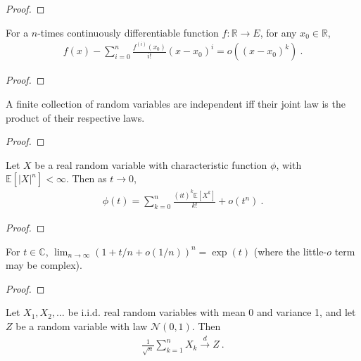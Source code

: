 \begin{proof}\leanok
{}
\end{proof}

\begin{lemma}\label{lem:taylor_peano}
\mathlibok
{}
For a $n$-times continuously differentiable function $f : \mathbb{R} \to E$, for any $x_0\in\mathbb{R}$,
\begin{align*}
f(x) - \sum_{i=0}^n\frac{f^{(i)}(x_0)}{i!}(x-x_0)^i = o((x - x_0)^k)
\: .
\end{align*}
\end{lemma}

\begin{proof}\leanok
\end{proof}

\begin{lemma}\label{lem:iIndepFun_iff_pi_map_eq_map}
\mathlibok
{}
A finite collection of random variables are independent iff their joint law is the product of their respective laws.
\end{lemma}

\begin{proof}\leanok
\end{proof}

\begin{lemma}\label{lem:charFun_taylor}
\leanok
{}
Let $X$ be a real random variable with characteristic function $\phi$, with $\mathbb{E}[\vert X \vert^n] < \infty$. Then as $t \to 0$,
\begin{align*}
\phi(t) = \sum_{k=0}^n \frac{(it)^k \mathbb{E}[X^k]}{k!} + o(t^n)
\: .
\end{align*}
\end{lemma}

\begin{proof}\leanok
{}
\end{proof}

\begin{lemma}\label{lem:tendsto_pow_exp_of_isLittleO}
\leanok
{}
For $t\in\mathbb{C}$, $\lim_{n\to\infty}(1+t/n+o(1/n))^n=\exp(t)$ (where the little-$o$ term may be complex).
\end{lemma}

\begin{proof}\leanok
\end{proof}

\begin{theorem}\label{thm:clt}
    \leanok
Let $X_1, X_2, \ldots$ be i.i.d. real random variables with mean 0 and variance 1, and let $Z$ be a random variable with law $\mathcal N(0,1)$. Then
\begin{align*}
\frac{1}{\sqrt{n}}\sum_{k=1}^n X_k \xrightarrow{d} Z \: .
\end{align*}
\end{theorem}

